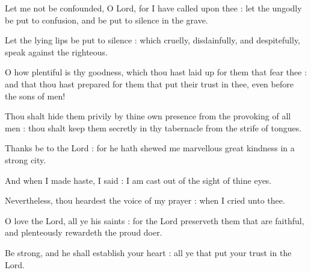 Let me not be confounded, O Lord, for I have called upon thee : let the ungodly be put to confusion, and be put to silence in the grave.\par
{}Let the lying lips be put to silence : which cruelly, disdainfully, and despitefully, speak against the righteous.\par
{}O how plentiful is thy goodness, which thou hast laid up for them that fear thee : and that thou hast prepared for them that put their trust in thee, even before the sons of men!\par
{}Thou shalt hide them privily by thine own presence from the provoking of all men : thou shalt keep them secretly in thy tabernacle from the strife of tongues.\par
{}Thanks be to the Lord : for he hath shewed me marvellous great kindness in a strong city.\par
{}And when I made haste, I said : I am cast out of the sight of thine eyes.\par
{}Nevertheless, thou heardest the voice of my prayer : when I cried unto thee.\par
{}O love the Lord, all ye his saints : for the Lord preserveth them that are faithful, and plenteously rewardeth the proud doer.\par
{}Be strong, and he shall establish your heart : all ye that put your trust in the Lord.\par



